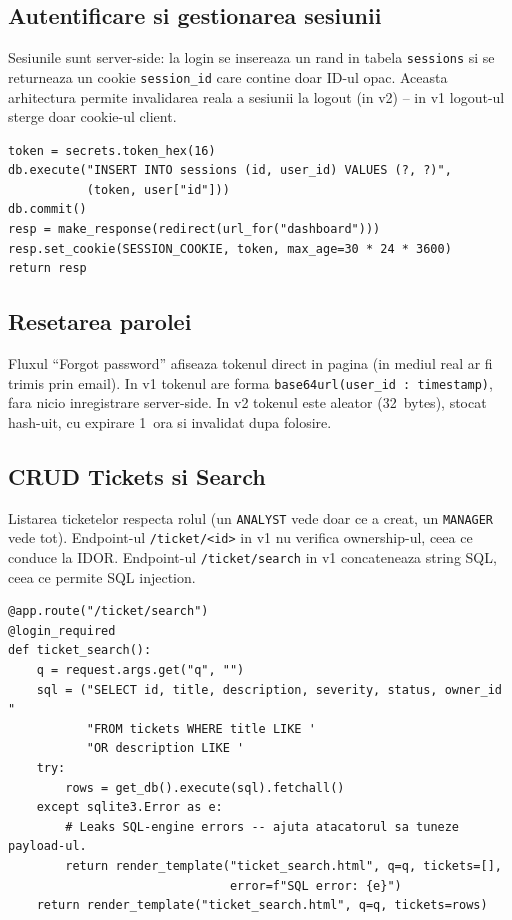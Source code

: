 \documentclass[12pt,a4paper]{article}
\begin{document}
\subsection{Autentificare si gestionarea sesiunii}
Sesiunile sunt server-side: la login se insereaza un rand in tabela
\texttt{sessions} si se returneaza un cookie \texttt{session\_id} care
contine doar ID-ul opac. Aceasta arhitectura permite invalidarea reala
a sesiunii la logout (in v2) -- in v1 logout-ul sterge doar cookie-ul
client.

\begin{lstlisting}[style=py, caption={Login si emiterea cookie-ului in v1}]
token = secrets.token_hex(16)
db.execute("INSERT INTO sessions (id, user_id) VALUES (?, ?)",
           (token, user["id"]))
db.commit()
resp = make_response(redirect(url_for("dashboard")))
resp.set_cookie(SESSION_COOKIE, token, max_age=30 * 24 * 3600)
return resp
\end{lstlisting}

\subsection{Resetarea parolei}
Fluxul ``Forgot password'' afiseaza tokenul direct in pagina (in mediul
real ar fi trimis prin email). In v1 tokenul are forma
\texttt{base64url(user\_id : timestamp)}, fara nicio inregistrare
server-side. In v2 tokenul este aleator (32~bytes), stocat hash-uit, cu
expirare 1~ora si invalidat dupa folosire.

\subsection{CRUD Tickets si Search}
Listarea ticketelor respecta rolul (un \texttt{ANALYST} vede doar ce a
creat, un \texttt{MANAGER} vede tot). Endpoint-ul \texttt{/ticket/<id>}
in v1 nu verifica ownership-ul, ceea ce conduce la IDOR. Endpoint-ul
\texttt{/ticket/search} in v1 concateneaza string SQL, ceea ce permite
SQL injection.

\begin{lstlisting}[style=py, caption={Search vulnerabil (concatenare SQL)}]
@app.route("/ticket/search")
@login_required
def ticket_search():
    q = request.args.get("q", "")
    sql = ("SELECT id, title, description, severity, status, owner_id "
           "FROM tickets WHERE title LIKE '
           "OR description LIKE '
    try:
        rows = get_db().execute(sql).fetchall()
    except sqlite3.Error as e:
        # Leaks SQL-engine errors -- ajuta atacatorul sa tuneze payload-ul.
        return render_template("ticket_search.html", q=q, tickets=[],
                               error=f"SQL error: {e}")
    return render_template("ticket_search.html", q=q, tickets=rows)
\end{lstlisting}
\end{document}
